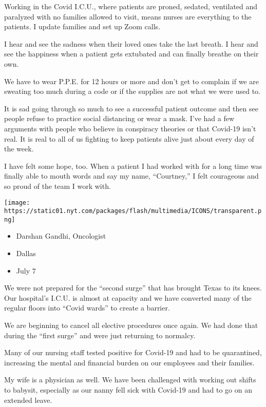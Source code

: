 Working in the Covid I.C.U., where patients are proned, sedated,
ventilated and paralyzed with no families allowed to visit, means nurses
are everything to the patients. I update families and set up Zoom calls.

I hear and see the sadness when their loved ones take the last breath. I
hear and see the happiness when a patient gets extubated and can finally
breathe on their own.

We have to wear P.P.E. for 12 hours or more and don't get to complain if
we are sweating too much during a code or if the supplies are not what
we were used to.

It is sad going through so much to see a successful patient outcome and
then see people refuse to practice social distancing or wear a mask.
I've had a few arguments with people who believe in conspiracy theories
or that Covid-19 isn't real. It is real to all of us fighting to keep
patients alive just about every day of the week.

I have felt some hope, too. When a patient I had worked with for a long
time was finally able to mouth words and say my name, ``Courtney,'' I
felt courageous and so proud of the team I work with.

\texttt{[image: https://static01.nyt.com/packages/flash/multimedia/ICONS/transparent.png]}

\begin{itemize}
\tightlist
\item
  Darshan Gandhi, Oncologist
\item
  Dallas
\item
  July 7
\end{itemize}

We were not prepared for the ``second surge'' that has brought Texas to
its knees. Our hospital's I.C.U. is almost at capacity and we have
converted many of the regular floors into ``Covid wards'' to create a
barrier.

We are beginning to cancel all elective procedures once again. We had
done that during the ``first surge'' and were just returning to
normalcy.

Many of our nursing staff tested positive for Covid-19 and had to be
quarantined, increasing the mental and financial burden on our employees
and their families.

My wife is a physician as well. We have been challenged with working out
shifts to babysit, especially as our nanny fell sick with Covid-19 and
had to go on an extended leave.

